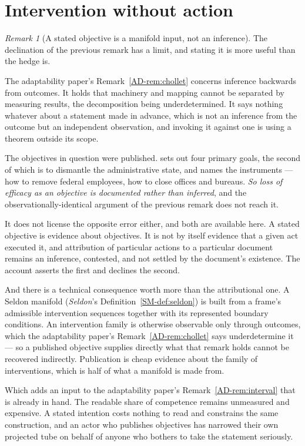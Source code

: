 \documentclass[11pt,a4paper]{article}
\theoremstyle{remark}
\newtheorem{remark}[definition]{Remark}
\begin{document}
\section{Intervention without action}\label{sec:intervention}
\begin{remark}[A stated objective is a manifold input, not an inference]\label{rem:stated}
The declination of the previous remark has a limit, and stating it is more useful than the hedge is.

The adaptability paper's Remark~\ref{AD-rem:chollet} concerns inference backwards from outcomes. It holds that machinery and
mapping cannot be separated by measuring results, the decomposition being underdetermined. It says
nothing whatever about a statement made in advance, which is not an inference from the outcome but an
independent observation, and invoking it against one is using a theorem outside its scope.

The objectives in question were published. \citet{mandate2023} sets out four primary goals, the
second of which is to dismantle the administrative state, and names the instruments --- how to remove
federal employees, how to close offices and bureaus. \emph{So loss of efficacy as an objective is
documented rather than inferred}, and the observationally-identical argument of the previous remark does
not reach it.

It does not license the opposite error either, and both are available here. A stated objective is
evidence about objectives. It is not by itself evidence that a given act executed it, and
attribution of particular actions to a particular document remains an inference, contested, and not
settled by the document's existence. The account asserts the first and declines the second.

And there is a technical consequence worth more than the attributional one. A Seldon manifold
(\emph{Seldon}'s Definition~\ref{SM-def:seldon}) is built from a frame's admissible intervention
sequences together with its represented boundary conditions. An intervention family is otherwise observable only through outcomes, which
the adaptability paper's Remark~\ref{AD-rem:chollet} says underdetermine it --- so a published objective supplies directly what that
remark holds cannot be recovered indirectly. Publication is cheap evidence about the family of
interventions, which is half of what a manifold is made from.

Which adds an input to the adaptability paper's Remark~\ref{AD-rem:interval} that is already in hand. The readable share of
competence remains unmeasured and expensive. A stated intention costs nothing to read and
constrains the same construction, and an actor who publishes objectives has narrowed their own
projected tube on behalf of anyone who bothers to take the statement seriously.
\end{remark}
\end{document}
